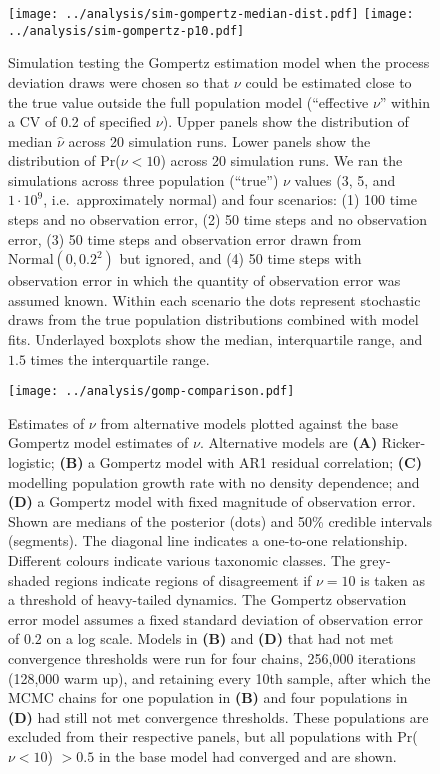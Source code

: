 \documentclass[12pt]{article}
\begin{document}
\clearpage

\begin{figure}[htbp]
\begin{center}
\texttt{[image: ../analysis/sim-gompertz-median-dist.pdf]}
\texttt{[image: ../analysis/sim-gompertz-p10.pdf]}

\caption{Simulation testing the Gompertz estimation model when the process deviation draws were chosen so that $\nu$ could be estimated close to the true value outside the full population model (``effective $\nu$'' within a CV of 0.2 of specified $\nu$). Upper panels show the distribution of median $\widehat{\nu}$ across 20 simulation runs. Lower panels show the distribution of Pr($\nu < 10$) across 20 simulation runs. We ran the simulations across three population (``true'') $\nu$ values (3, 5, and $1\cdot 10^9$, i.e.\ approximately normal) and four scenarios: (1) 100 time steps and no observation error, (2) 50 time steps and no observation error, (3) 50 time steps and observation error drawn from $\mathrm{Normal} (0, 0.2^2)$ but ignored, and (4) 50 time steps with observation error in which the quantity of observation error was assumed known. Within each scenario the dots represent stochastic draws from the true population distributions combined with model fits. Underlayed boxplots show the median, interquartile range, and $1.5$ times the interquartile range.}

\label{fig:sim-prob}
\end{center}
\end{figure}

\begin{figure}[htbp]
\begin{center}
\texttt{[image: ../analysis/gomp-comparison.pdf]}

\caption{Estimates of $\nu$ from alternative models plotted against the
    base Gompertz model estimates of $\nu$. Alternative models are \textbf{(A)}
    Ricker-logistic; \textbf{(B)} a Gompertz model with AR1 residual correlation;
    \textbf{(C)} modelling population growth rate with no density dependence; and
    \textbf{(D)} a Gompertz model with fixed magnitude of observation error. Shown
are medians of the posterior (dots) and 50\% credible intervals (segments). The
diagonal line indicates a one-to-one relationship. Different colours indicate
various taxonomic classes. The grey-shaded regions indicate regions of
disagreement if $\nu = 10$ is taken as a threshold of heavy-tailed dynamics.
The Gompertz observation error model assumes a fixed standard deviation of
observation error of $0.2$ on a log scale. Models in \textbf{(B)} and \textbf{(D)}
that had not met convergence thresholds were run for four chains, 256,000 iterations (128,000 warm up), and retaining every 10th sample, after which the MCMC chains for one population in \textbf{(B)} and four populations in \textbf{(D)} had still not met convergence thresholds. These populations are excluded from their respective panels, but all populations with Pr($\nu < 10$) $> 0.5$ in the base model had converged and are shown.}

\label{fig:alt}
\end{center}
\end{figure}
\end{document}
